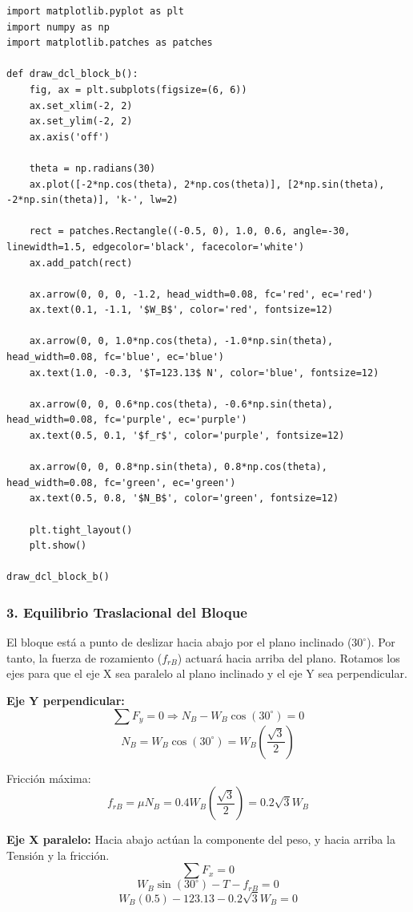 \documentclass[12pt, a4paper]{article}
\begin{document}
\begin{lstlisting}
import matplotlib.pyplot as plt
import numpy as np
import matplotlib.patches as patches

def draw_dcl_block_b():
    fig, ax = plt.subplots(figsize=(6, 6))
    ax.set_xlim(-2, 2)
    ax.set_ylim(-2, 2)
    ax.axis('off')
    
    theta = np.radians(30)
    ax.plot([-2*np.cos(theta), 2*np.cos(theta)], [2*np.sin(theta), -2*np.sin(theta)], 'k-', lw=2)
    
    rect = patches.Rectangle((-0.5, 0), 1.0, 0.6, angle=-30, linewidth=1.5, edgecolor='black', facecolor='white')
    ax.add_patch(rect)
    
    ax.arrow(0, 0, 0, -1.2, head_width=0.08, fc='red', ec='red')
    ax.text(0.1, -1.1, '$W_B$', color='red', fontsize=12)
    
    ax.arrow(0, 0, 1.0*np.cos(theta), -1.0*np.sin(theta), head_width=0.08, fc='blue', ec='blue')
    ax.text(1.0, -0.3, '$T=123.13$ N', color='blue', fontsize=12)
    
    ax.arrow(0, 0, 0.6*np.cos(theta), -0.6*np.sin(theta), head_width=0.08, fc='purple', ec='purple')
    ax.text(0.5, 0.1, '$f_r$', color='purple', fontsize=12)
    
    ax.arrow(0, 0, 0.8*np.sin(theta), 0.8*np.cos(theta), head_width=0.08, fc='green', ec='green')
    ax.text(0.5, 0.8, '$N_B$', color='green', fontsize=12)
    
    plt.tight_layout()
    plt.show()

draw_dcl_block_b()
\end{lstlisting}

\subsubsection*{3. Equilibrio Traslacional del Bloque}
El bloque está a punto de deslizar hacia abajo por el plano inclinado ($30^\circ$). Por tanto, la fuerza de rozamiento ($f_{rB}$) actuará hacia arriba del plano.
Rotamos los ejes para que el eje X sea paralelo al plano inclinado y el eje Y sea perpendicular.

\textbf{Eje Y perpendicular:}
$$\sum F_y = 0 \Rightarrow N_B - W_B \cos(30^\circ) = 0$$
$$N_B = W_B \cos(30^\circ) = W_B \left( \frac{\sqrt{3}}{2} \right)$$

Fricción máxima:
$$f_{rB} = \mu N_B = 0.4 W_B \left( \frac{\sqrt{3}}{2} \right) = 0.2\sqrt{3} W_B$$

\textbf{Eje X paralelo:}
Hacia abajo actúan la componente del peso, y hacia arriba la Tensión y la fricción.
$$\sum F_x = 0$$
$$W_B \sin(30^\circ) - T - f_{rB} = 0$$
$$W_B (0.5) - 123.13 - 0.2\sqrt{3} W_B = 0$$
\end{document}
